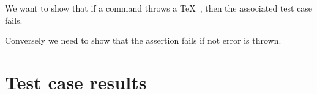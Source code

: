 
We want to show that if a command throws a \TeX\ \type{\errmessage}, then 
the associated test case fails. 

\startConTest
\begingroup
  \mockErrMessage
\endgroup
\stopConTest
\skipTestCase


Conversely we need to show that the \type{\assertErrorThrown} assertion 
fails if not error is thrown. 

\startConTest
\begingroup
  \mockErrMessage
  \stopAssertShouldFail
\endgroup
\stopConTest
\skipTestCase

\stopTestSuite

\section{Test case results}

\reportMkIVStats

\reportFailures

\stopchapter
